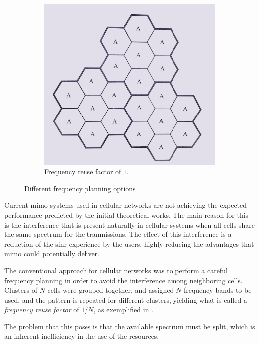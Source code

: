 \begin{figure}[t]
\begin{subfigure}[b]{0.45\textwidth}
        \includegraphics[width=\textwidth]{./01.introduction/img/universal_freq_reuse.png}
        \caption{Frequency reuse factor of $1$.}
        \label{fig:ufreuse}
    \end{subfigure}
    \caption{Different frequency planning options}
    \label{fig:freq_plan}
\end{figure}

Current \gls{mimo} systems used in cellular networks are not achieving the
expected performance predicted by the initial theoretical works. The main reason
for this is the interference that is present naturally in cellular systems when
all cells share the same spectrum for the tranmissions. The effect of this
interference is a reduction of the \gls{sinr} experience by the users, highly
reducing the advantages that \gls{mimo} could potentially deliver.

The conventional approach for cellular networks was to perform a careful
frequency planning in order to avoid the interference among neighboring cells.
Clusters of $N$ cells were grouped together, and assigned $N$ frequency bands to
be used, and the pattern is repeated for different clusters, yielding what is
called a \emph{frequency reuse factor} of $1/N$, as exemplified in
.

The problem that this poses is that the available spectrum must be split, which
is an inherent inefficiency in the use of the resources.

